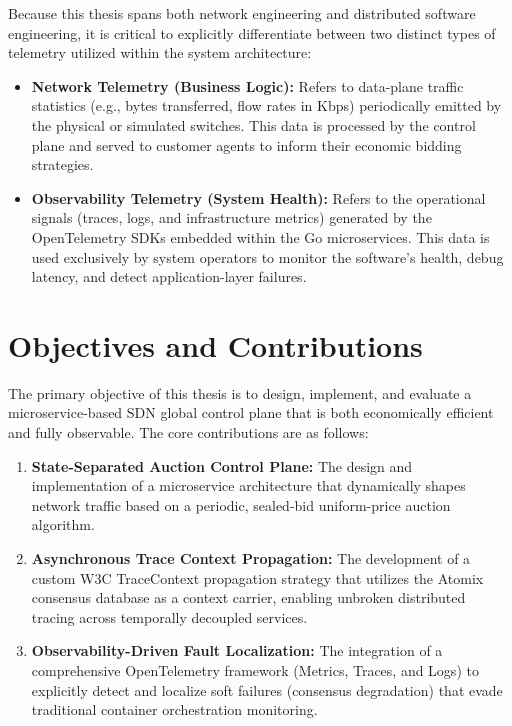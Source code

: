 Because this thesis spans both network engineering and distributed software engineering, it is critical to explicitly differentiate between two distinct types of telemetry utilized within the system architecture:

\begin{itemize}
    \item \textbf{Network Telemetry (Business Logic):} Refers to data-plane traffic statistics (e.g., bytes transferred, flow rates in Kbps) periodically emitted by the physical or simulated switches. This data is processed by the control plane and served to customer agents to inform their economic bidding strategies.
    \item \textbf{Observability Telemetry (System Health):} Refers to the operational signals (traces, logs, and infrastructure metrics) generated by the OpenTelemetry SDKs embedded within the Go microservices. This data is used exclusively by system operators to monitor the software's health, debug latency, and detect application-layer failures.
\end{itemize}

\section{Objectives and Contributions}

The primary objective of this thesis is to design, implement, and evaluate a microservice-based SDN global control plane that is both economically efficient and fully observable. The core contributions are as follows:

\begin{enumerate}
    \item \textbf{State-Separated Auction Control Plane:} The design and implementation of a microservice architecture that dynamically shapes network traffic based on a periodic, sealed-bid uniform-price auction algorithm.
    \item \textbf{Asynchronous Trace Context Propagation:} The development of a custom W3C TraceContext propagation strategy that utilizes the Atomix consensus database as a context carrier, enabling unbroken distributed tracing across temporally decoupled services.
    \item \textbf{Observability-Driven Fault Localization:} The integration of a comprehensive OpenTelemetry framework (Metrics, Traces, and Logs) to explicitly detect and localize soft failures (consensus degradation) that evade traditional container orchestration monitoring.
\end{enumerate}

